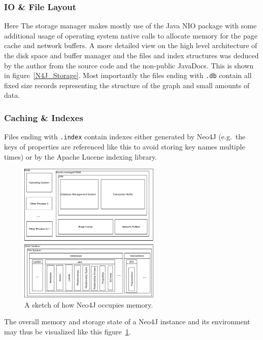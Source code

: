     \subsubsection*{IO \& File Layout}\label{files_sec}
    Here The storage manager makes mostly use of the Java NIO package with some additional usage of operating system native calls to allocate memory for the page cache and network buffers. 
    A more detailed view on the high level architecture of the disk space and buffer manager and the files and index structures was deduced by the author from the source code and the non-public JavaDocs.
    This is shown in figure~\ref{N4J_Storage}.
    Most importantly the files ending with \texttt{.db} contain all fixed size records representing the structure of the graph and small amounts of data.
    
    \subsubsection*{Caching \& Indexes} 
    Files ending with \texttt{.index} contain indexes either generated by Neo4J (e.g.\ the keys of properties are referenced like this to avoid storing key names multiple times) or by the Apache Lucene indexing library.
    
    \begin{figure}[htp]
    \begin{center}
    \includegraphics[keepaspectratio,width=0.6\textwidth]{img/00_intro/N4J_memory_view.png}
    \end{center}
    \caption{A sketch of how Neo4J occupies memory.}
    \label{N4J_memory_view}
    \end{figure}
    
    The overall memory and storage state of a Neo4J instance and its environment may thus be visualized like this figure~\ref{N4J_memory_view}.
    
